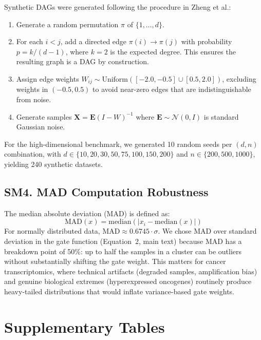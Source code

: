 \documentclass[11pt,a4paper]{article}
\begin{document}
Synthetic DAGs were generated following the procedure in Zheng et al.:
\begin{enumerate}[leftmargin=*,itemsep=2pt]
    \item Generate a random permutation $\pi$ of $\{1,\ldots,d\}$.
    \item For each $i < j$, add a directed edge $\pi(i) \to \pi(j)$ with probability $p = k/(d-1)$, where $k=2$ is the expected degree. This ensures the resulting graph is a DAG by construction.
    \item Assign edge weights $W_{ij} \sim \text{Uniform}([-2.0, -0.5] \cup [0.5, 2.0])$, excluding weights in $(-0.5, 0.5)$ to avoid near-zero edges that are indistinguishable from noise.
    \item Generate samples $\mathbf{X} = \mathbf{E}(I - W)^{-1}$ where $\mathbf{E} \sim \mathcal{N}(0, I)$ is standard Gaussian noise.
\end{enumerate}

For the high-dimensional benchmark, we generated 10 random seeds per $(d, n)$ combination, with $d \in \{10, 20, 30, 50, 75, 100, 150, 200\}$ and $n \in \{200, 500, 1000\}$, yielding 240 synthetic datasets.

\subsection*{SM4. MAD Computation Robustness}

The median absolute deviation (MAD) is defined as:
\[
\text{MAD}(x) = \text{median}(|x_i - \text{median}(x)|)
\]
For normally distributed data, $\text{MAD} \approx 0.6745 \cdot \sigma$. We chose MAD over standard deviation in the gate function (Equation~2, main text) because MAD has a breakdown point of 50\%: up to half the samples in a cluster can be outliers without substantially shifting the gate weight. This matters for cancer transcriptomics, where technical artifacts (degraded samples, amplification bias) and genuine biological extremes (hyperexpressed oncogenes) routinely produce heavy-tailed distributions that would inflate variance-based gate weights.

\newpage
\section*{Supplementary Tables}
\end{document}
